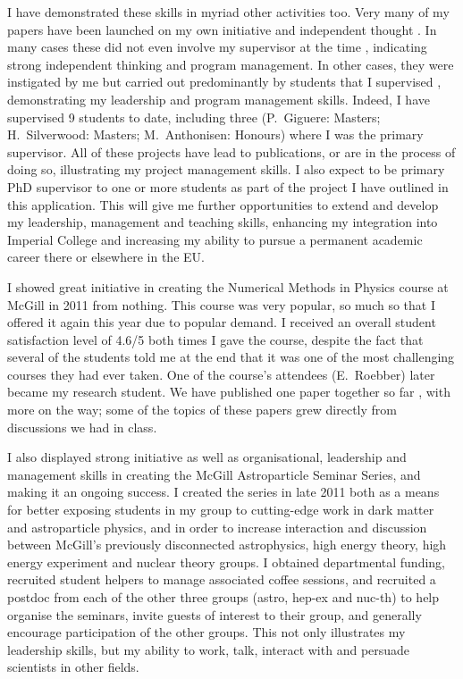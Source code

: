 \documentclass[a4paper,11pt]{article}
\begin{document}
I have demonstrated these skills in myriad other activities too.  Very many of my papers have been launched on my own initiative and independent thought \cite{Scott09Ni, SS09, Scott09c, Scott11, Bringmann11, pippi, Vincent12, IC22Methods, Silverwood12}. In many cases these did not even involve my supervisor at the time \cite{Scott09Ni, SS09, Scott11, Bringmann11, pippi, IC22Methods}, indicating strong independent thinking and program management.  In other cases, they were instigated by me but carried out predominantly by students that I supervised \cite{Silverwood12, Vincent12}, demonstrating my leadership and program management skills.  Indeed, I have supervised 9 students to date, including three (P.\ Giguere: Masters; H.\ Silverwood: Masters; M.\ Anthonisen: Honours) where I was the primary supervisor.  All of these projects have lead to publications, or are in the process of doing so, illustrating my project management skills.  I also expect to be primary PhD supervisor to one or more students as part of the project I have outlined in this application.  This will give me further opportunities to extend and develop my leadership, management and teaching skills, enhancing my integration into Imperial College and increasing my ability to pursue a permanent academic career there or elsewhere in the EU.

I showed great initiative in creating the Numerical Methods in Physics course at McGill in 2011 from nothing. This course was very popular, so much so that I offered it again this year due to popular demand. I received an overall student satisfaction level of 4.6/5 both times I gave the course, despite the fact that several of the students told me at the end that it was one of the most challenging courses they had ever taken.  One of the course’s attendees (E.\ Roebber) later became my research student. We have published one paper together so far \cite{Scott11}, with more on the way; some of the topics of these papers grew directly from discussions we had in class.

I also displayed strong initiative as well as organisational, leadership and management skills in creating the McGill Astroparticle Seminar Series, and making it an ongoing success.  I created the series in late 2011 both as a means for better exposing students in my group to cutting-edge work in dark matter and astroparticle physics, and in order to increase interaction and discussion between McGill's previously disconnected astrophysics, high energy theory, high energy experiment and nuclear theory groups.  I obtained departmental funding, recruited student helpers to manage associated coffee sessions, and recruited a postdoc from each of the other three groups (astro, hep-ex and nuc-th) to help organise the seminars, invite guests of interest to their group, and generally encourage participation of the other groups.  This not only illustrates my leadership skills, but my ability to work, talk, interact with and persuade scientists in other fields.
\end{document}
